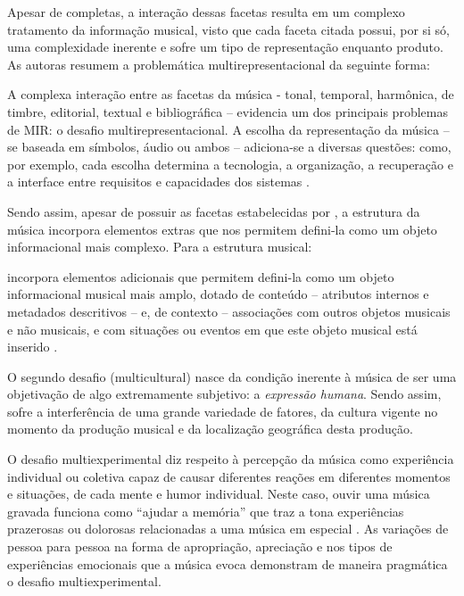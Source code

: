 Apesar de completas, a interação dessas facetas resulta em um complexo tratamento da informação musical, visto que cada faceta citada possui, por si só, uma complexidade inerente e sofre um tipo de representação enquanto produto. As autoras  resumem a problemática multirepresentacional da seguinte forma:

\begin{citacao}
    A complexa interação entre as facetas da música - tonal, temporal, harmônica, de timbre, editorial, textual e bibliográfica – evidencia um dos principais problemas de MIR: o desafio multirepresentacional. A escolha da representação da música – se baseada em símbolos, áudio ou ambos – adiciona-se a diversas questões: como, por exemplo, cada escolha determina a tecnologia, a organização, a recuperação e a interface entre requisitos e capacidades dos sistemas \cite{santini&souza2007}.
\end{citacao}

Sendo assim, apesar de possuir as facetas estabelecidas por \cite{downie2003}, a estrutura da música incorpora elementos extras que nos permitem defini-la como um objeto informacional mais complexo. Para  a estrutura musical:

\begin{citacao}
    [...] incorpora elementos adicionais que permitem defini-la como um objeto informacional musical mais amplo, dotado de conteúdo – atributos internos e metadados descritivos – e, de contexto – associações com outros objetos musicais e não musicais, e com situações ou eventos em que este objeto musical está inserido \cite{cruz2014}.
\end{citacao}

O segundo desafio (multicultural) nasce da condição inerente à música de ser uma objetivação de algo extremamente subjetivo: a \textit{expressão humana}. Sendo assim, sofre a interferência de uma grande variedade de fatores, da cultura vigente no momento da produção musical e da localização geográfica desta produção.

O desafio multiexperimental diz respeito à percepção da música como experiência individual ou coletiva capaz de causar diferentes reações em diferentes momentos e situações, de cada mente e humor individual. Neste caso, ouvir uma música gravada funciona como “ajudar a memória” que traz a tona experiências prazerosas ou dolorosas relacionadas a uma música em especial \cite{downie2003,santini&souza2007}. As variações de pessoa para pessoa na forma de apropriação, apreciação e nos tipos de experiências emocionais que a música evoca demonstram de maneira pragmática o desafio multiexperimental.

